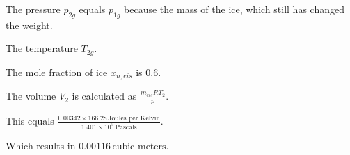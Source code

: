 The pressure \( p_{2g} \) equals \( p_{1g} \) because the mass of the ice, which still has changed the weight.

The temperature \( T_{2g} \).

The mole fraction of ice \( x_{n,eis} \) is 0.6.

The volume \( V_2 \) is calculated as \( \frac{m_{eis} RT_2}{p} \).

This equals \( \frac{0.00342 \times 166.28 \, \text{Joules per Kelvin}}{1.401 \times 10^5 \, \text{Pascals}} \).

Which results in \( 0.00116 \, \text{cubic meters} \).